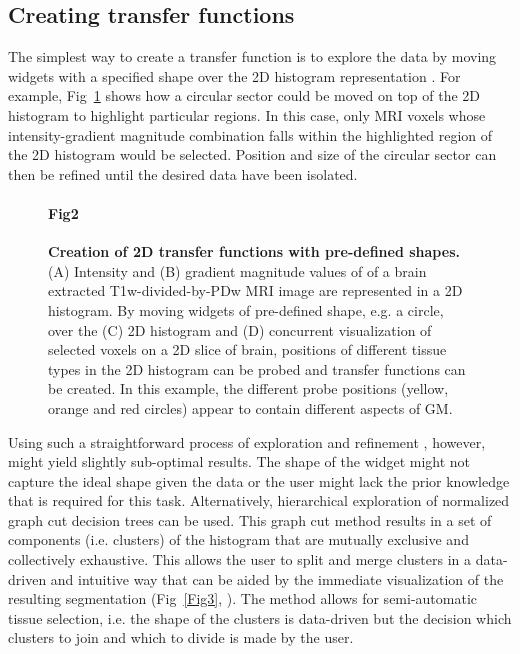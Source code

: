 \subsection{Creating transfer functions}
The simplest way to create a transfer function is to explore the data by moving widgets with a specified shape over the 2D histogram representation \cite{Kniss2005}. For example, Fig~\ref{Fig2} shows how a circular sector could be moved on top of the 2D histogram to highlight particular regions. In this case, only MRI voxels whose intensity-gradient magnitude combination falls within the highlighted region of the 2D histogram would be selected. Position and size of the circular sector can then be refined until the desired data have been isolated.

\begin{figure}[!ht]
\paragraph{Fig2}
\caption{{\bf Creation of 2D transfer functions with pre-defined shapes.} (A) Intensity and (B) gradient magnitude values of of a brain extracted T1w-divided-by-PDw MRI image are represented in a 2D histogram. By moving widgets of pre-defined shape, e.g. a circle, over the (C) 2D histogram and (D) concurrent visualization of selected voxels on a 2D slice of brain, positions of different tissue types in the 2D histogram can be probed and transfer functions can be created. In this example, the different probe positions (yellow, orange and red circles) appear to contain different aspects of GM.}
\label{Fig2}
\end{figure}

Using such a straightforward process of exploration and refinement \cite{Kniss2002}, however, might yield slightly sub-optimal results. The shape of the widget might not capture the ideal shape given the data or the user might lack the prior knowledge that is required for this task. Alternatively, hierarchical exploration of normalized graph cut decision trees \cite{Ip2012} can be used. This graph cut method results in a set of components (i.e. clusters) of the histogram that are mutually exclusive and collectively exhaustive. This allows the user to split and merge clusters in a data-driven and intuitive way that can be aided by the immediate visualization of the resulting segmentation (Fig~\ref{Fig3}, ). The method allows for semi-automatic tissue selection, i.e. the shape of the clusters is data-driven but the decision which clusters to join and which to divide is made by the user.

